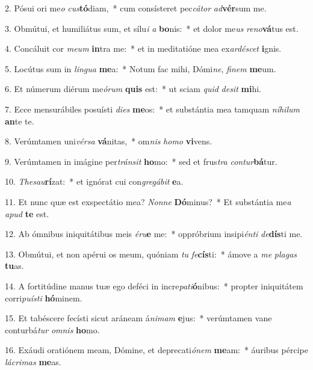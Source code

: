 2. Pósui ori me\textit{o} \textit{cus}\textbf{tó}diam,~*  cum consísteret pec\textit{cá}\textit{tor} \textit{ad}\textbf{vér}sum me.\

3. Obmútui, et humiliátus sum, et sílu\textit{i} \textit{a} \textbf{bo}nis:~*  et dolor me\textit{us} \textit{re}\textit{no}\textbf{vá}tus est.\

4. Concáluit cor \textit{me}\textit{um} \textbf{in}tra me:~*  et in meditatióne mea ex\textit{ar}\textit{dé}\textit{scet} \textbf{i}gnis.\

5. Locútus sum in \textit{lin}\textit{gua} \textbf{me}a:~*  Notum fac mihi, Dómi\textit{ne}, \textit{fi}\textit{nem} \textbf{me}um.\

6. Et númerum diérum me\textit{ó}\textit{rum} \textbf{quis} est:~*  ut sciam \textit{quid} \textit{de}\textit{sit} \textbf{mi}hi.\

7. Ecce mensurábiles posuísti \textit{di}\textit{es} \textbf{me}os:~*  et substántia mea tamquam \textit{ní}\textit{hi}\textit{lum} \textbf{an}te te.\

8. Verúmtamen uni\textit{vér}\textit{sa} \textbf{vá}nitas,~*  om\textit{nis} \textit{ho}\textit{mo} \textbf{vi}vens.\

9. Verúmtamen in imágine per\textit{tráns}\textit{it} \textbf{ho}mo:~*  sed et frus\textit{tra} \textit{con}\textit{tur}\textbf{bá}tur.\

10. \textit{The}\textit{sau}\textbf{rí}zat:~*  et ignórat cui con\textit{gre}\textit{gá}\textit{bit} \textbf{e}a.\

11. Et nunc quæ est exspectátio mea? \textit{Non}\textit{ne} \textbf{Dó}minus?~*  Et substántia me\textit{a} \textit{a}\textit{pud} \textbf{te} est.\

12. Ab ómnibus iniquitátibus meis \textit{é}\textit{ru}\textbf{e} me:~*  oppróbrium insipi\textit{én}\textit{ti} \textit{de}\textbf{dís}ti me.\

13. Obmútui, et non apérui os meum, quóniam \textit{tu} \textit{fe}\textbf{cís}ti:~*  ámove a \textit{me} \textit{pla}\textit{gas} \textbf{tu}as.\

14. A fortitúdine manus tuæ ego deféci in incre\textit{pa}\textit{ti}\textbf{ó}nibus:~*  propter iniquitátem corri\textit{pu}\textit{ís}\textit{ti} \textbf{hó}minem.\

15. Et tabéscere fecísti sicut aráneam á\textit{ni}\textit{mam} \textbf{e}jus:~*  verúmtamen vane conturbá\textit{tur} \textit{om}\textit{nis} \textbf{ho}mo.\

16. Exáudi oratiónem meam, Dómine, et deprecati\textit{ó}\textit{nem} \textbf{me}am:~*  áuribus pércipe \textit{lá}\textit{cri}\textit{mas} \textbf{me}as.\

